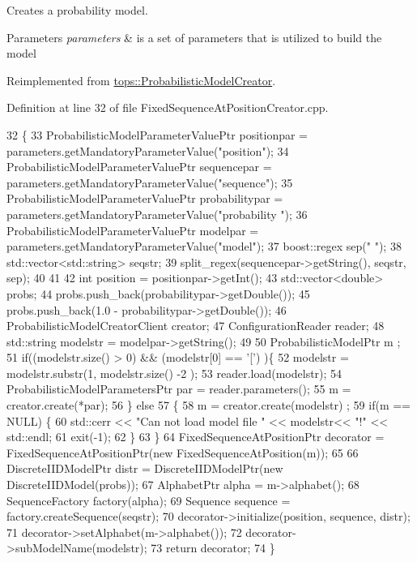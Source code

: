 Creates a probability model. 


\begin{DoxyParams}{Parameters}
{\em parameters} & is a set of parameters that is utilized to build the model \\
\hline
\end{DoxyParams}


Reimplemented from \hyperlink{classtops_1_1ProbabilisticModelCreator_afed6c8ffa45fff446bdaa8b533da8f7c}{tops\+::\+Probabilistic\+Model\+Creator}.



Definition at line 32 of file Fixed\+Sequence\+At\+Position\+Creator.\+cpp.


\begin{DoxyCode}
32                                                                                                            
          \{
33     ProbabilisticModelParameterValuePtr positionpar = parameters.getMandatoryParameterValue(\textcolor{stringliteral}{"position"});
34     ProbabilisticModelParameterValuePtr sequencepar = parameters.getMandatoryParameterValue(\textcolor{stringliteral}{"sequence"});
35     ProbabilisticModelParameterValuePtr probabilitypar = parameters.getMandatoryParameterValue(\textcolor{stringliteral}{"probability
      "});
36     ProbabilisticModelParameterValuePtr modelpar = parameters.getMandatoryParameterValue(\textcolor{stringliteral}{"model"});
37     boost::regex sep(\textcolor{stringliteral}{" "});
38     std::vector<std::string> seqstr;
39     split\_regex(sequencepar->getString(), seqstr,  sep);
40 
41 
42     \textcolor{keywordtype}{int} position = positionpar->getInt();
43     std::vector<double> probs;
44     probs.push\_back(probabilitypar->getDouble());
45     probs.push\_back(1.0 - probabilitypar->getDouble());
46     ProbabilisticModelCreatorClient creator;
47     ConfigurationReader reader;
48     std::string modelstr = modelpar->getString();
49 
50     ProbabilisticModelPtr m ;
51     \textcolor{keywordflow}{if}((modelstr.size() > 0) && (modelstr[0] == \textcolor{charliteral}{'['}) )\{
52       modelstr = modelstr.substr(1, modelstr.size() -2 );
53       reader.load(modelstr);
54       ProbabilisticModelParametersPtr par = reader.parameters();
55       m = creator.create(*par);
56     \} \textcolor{keywordflow}{else}
57       \{
58         m = creator.create(modelstr) ;
59         \textcolor{keywordflow}{if}(m == NULL) \{
60           std::cerr << \textcolor{stringliteral}{"Can not load model file "} << modelstr<< \textcolor{stringliteral}{"!"} << std::endl;
61           exit(-1);
62         \}
63       \}
64     FixedSequenceAtPositionPtr decorator = FixedSequenceAtPositionPtr(\textcolor{keyword}{new} FixedSequenceAtPosition(m));
65 
66     DiscreteIIDModelPtr distr = DiscreteIIDModelPtr(\textcolor{keyword}{new} DiscreteIIDModel(probs));
67     AlphabetPtr alpha = m->alphabet();
68     SequenceFactory factory(alpha);
69     Sequence sequence = factory.createSequence(seqstr);
70     decorator->initialize(position, sequence, distr);
71     decorator->setAlphabet(m->alphabet());
72     decorator->subModelName(modelstr);
73     \textcolor{keywordflow}{return} decorator;
74   \}
\end{DoxyCode}


